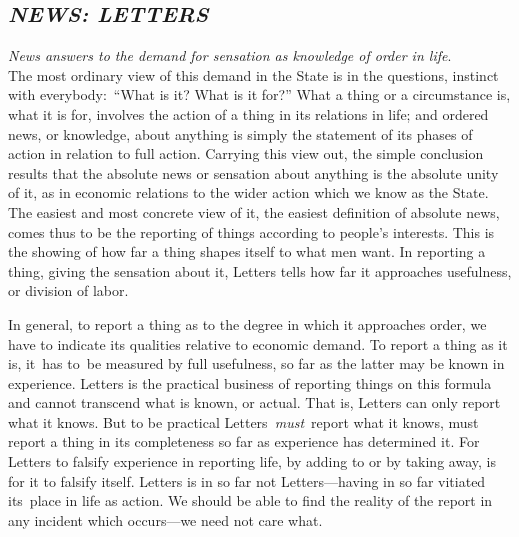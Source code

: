 \documentclass[twoside,symmetric,nobib,justified]{tufte-book}
\begin{document}
\hypertarget{news-letters}{%
\subsection{\texorpdfstring{\emph{NEWS:
LETTERS}~}{NEWS: LETTERS~}}\label{news-letters}}

\emph{News answers to the demand for sensation as knowledge of order in
life}.\\\noindent The most ordinary view of this demand in the State is in the
questions, instinct with everybody:~``What is it? What is it for?'' What
a thing or a circumstance is, what it is for, involves the action of a
thing in its relations in life; and ordered news, or knowledge, about
anything is simply the statement of its phases of action in relation to
full action. Carrying this view out, the simple conclusion results that
the absolute news or sensation about anything is the absolute unity of
it, as in economic relations to the wider action which we know as the
State. The easiest and most concrete view of it, the easiest definition
of absolute news, comes thus to be the reporting of things according to
people's interests. This is the showing of how far a thing shapes itself
to what men want. In reporting a thing, giving the sensation about it,
Letters tells how far it approaches usefulness, or division of labor.~

In general, to report a thing as to the degree in which it approaches
order, we have to indicate its qualities relative to economic demand. To
report a thing as it is, it~has to~be measured by full usefulness, so
far as the latter may be known in experience. Letters is the practical
business of reporting things on this formula and cannot transcend what
is known, or actual. That is, Letters can only report what it knows. But
to be practical Letters\emph{~must}~report what it knows, must report a
thing in its completeness so far as experience has determined it. For
Letters to falsify experience in reporting life, by adding to or by
taking away, is for it to falsify itself. Letters is in so far not
Letters---having in so far vitiated its~place in life as action. We
should be able to find the reality of the report in any incident which
occurs---we need not care what.
\end{document}
